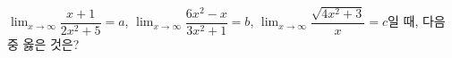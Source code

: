 $\displaystyle\lim_{x\to\infty}\dfrac{x+1}{2x^2+5}=a$, $\displaystyle\lim_{x\to\infty}\dfrac{6x^2-x}{3x^2+1}=b$, $\displaystyle\lim_{x\to\infty}\dfrac{\sqrt{4x^2+3}}{x}=c$일 때, 다음 중 옳은 것은?
